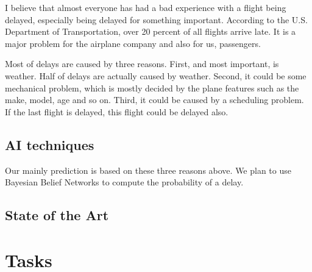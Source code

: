 \documentclass[12pt]{article}
\begin{document}
I believe that almost everyone has had a bad experience with a flight being 
delayed, especially being delayed for something important. According to the
U.S. Department of Transportation, over 20 percent of all flights arrive late. 
It is a major problem for the airplane company and also for us, passengers. 

Most of delays are caused by three reasons. First, and most important, is 
weather. Half of delays are actually caused by weather. Second, it could 
be some mechanical problem, which is mostly decided by the plane
features such as the make, model, age and so on. Third, it could be
caused by a scheduling problem. If the last flight is delayed, this flight 
could be delayed also. 





\subsection{AI techniques}


Our mainly prediction is based on these three reasons above. 
We plan to use Bayesian Belief Networks to compute the probability of a delay.




\subsection{State of the Art}





\section{Tasks}

\end{document}
